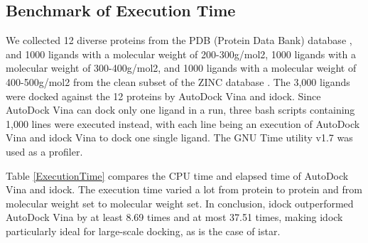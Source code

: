 \documentclass[10pt]{article}
\begin{document}
\subsection*{Benchmark of Execution Time}
We collected 12 diverse proteins from the PDB (Protein Data Bank) database \cite{540,537}, and 1000 ligands with a molecular weight of 200-300g/mol2, 1000 ligands with a molecular weight of 300-400g/mol2, and 1000 ligands with a molecular weight of 400-500g/mol2 from the clean subset of the ZINC database \cite{532,1178}. The 3,000 ligands were docked against the 12 proteins by AutoDock Vina and idock. Since AutoDock Vina can dock only one ligand in a run, three bash scripts containing 1,000 lines were executed instead, with each line being an execution of AutoDock Vina and idock Vina to dock one single ligand. The GNU Time utility v1.7 was used as a profiler.

Table \ref{ExecutionTime} compares the CPU time and elapsed time of AutoDock Vina and idock. The execution time varied a lot from protein to protein and from molecular weight set to molecular weight set. In conclusion, idock outperformed AutoDock Vina by at least 8.69 times and at most 37.51 times, making idock particularly ideal for large-scale docking, as is the case of istar.

\end{document}
